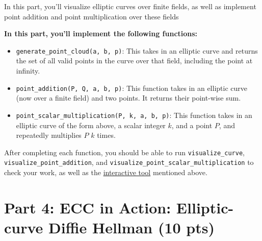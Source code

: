 \documentclass{article}
\begin{document}
    \begin{tcolorbox}[enhanced,interior style={top color=Plum!20,bottom color=Plum!30}]
        In this part, you'll visualize elliptic curves over finite fields, as well as implement point addition and point multiplication over these fields
    
        \textbf{In this part, you'll implement the following functions:}
        \begin{itemize}
            \item \lstinline{generate_point_cloud(a, b, p)}: This takes in an elliptic curve and returns the set of all valid points in the curve over that field, including the point at infinity.
            \item \lstinline{point_addition(P, Q, a, b, p)}: This function takes in an elliptic curve (now over a finite field) and two points. It returns their point-wise sum.
            \item \lstinline{point_scalar_multiplication(P, k, a, b, p)}: This function takes in an elliptic curve of the form above, a scalar integer $k$, and a point $P$, and repeatedly multiplies $P$ $k$ times.
        \end{itemize}
        After completing each function, you should be able to run \lstinline{visualize_curve}, \lstinline{visualize_point_addition}, and \lstinline{visualize_point_scalar_multiplication} to check your work, as well as the \href{https://andrea.corbellini.name/ecc/interactive/reals-add.html}{interactive tool} mentioned above.
    \end{tcolorbox}

\section*{Part 4: ECC in Action: Elliptic-curve Diffie Hellman (10 pts)}
\end{document}
